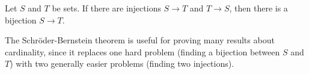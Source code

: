 \documentclass{article}
\begin{document}

Let $S$ and $T$ be sets.
If there are injections $S \to T$ and $T \to S$,
then there is a bijection $S\to T$.

The Schr\"oder-Bernstein theorem is useful
for proving many results about cardinality,
since it replaces one hard problem (finding a bijection between $S$ and $T$)
with two generally easier problems (finding two injections).
\end{document}
